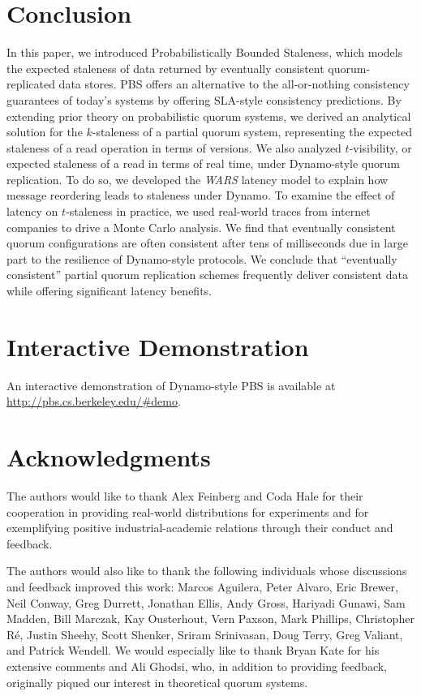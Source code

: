 \documentclass{vldb}
\newcommand{\sectionskip}{-0em}
\begin{document}
\vspace{\sectionskip}\section{Conclusion}
\label{sec:conclusion}

In this paper, we introduced Probabilistically Bounded Staleness,
which models the expected staleness of data returned by eventually
consistent quorum-replicated data stores.  PBS offers an alternative
to the all-or-nothing consistency guarantees of today's systems by
offering SLA-style consistency predictions. By extending prior theory
on probabilistic quorum systems, we derived an analytical solution for
the $k$-staleness of a partial quorum system, representing the
expected staleness of a read operation in terms of versions.  We also
analyzed $t$-visibility, or expected staleness of a read in terms of
real time, under Dynamo-style quorum replication.  To do so, we
developed the \textit{WARS} latency model to explain how message
reordering leads to staleness under Dynamo.  To examine the effect of
latency on $t$-staleness in practice, we used real-world traces from
internet companies to drive a Monte Carlo analysis.  We find that
eventually consistent quorum configurations are often consistent after
tens of milliseconds due in large part to the resilience of
Dynamo-style protocols.  We conclude that ``eventually consistent''
partial quorum replication schemes frequently deliver consistent data
while offering significant latency benefits.

\vspace{\sectionskip}\section*{Interactive Demonstration} An
interactive demonstration of Dynamo-style PBS is available at
\url{http://pbs.cs.berkeley.edu/#demo}.

\section*{Acknowledgments}

The authors would like to thank Alex Feinberg and Coda Hale for their
cooperation in providing real-world distributions for experiments and
for exemplifying positive industrial-academic relations through their
conduct and feedback.

The authors would also like to thank the following individuals whose
discussions and feedback improved this work: Marcos Aguilera, Peter
Alvaro, Eric Brewer, Neil Conway, Greg Durrett, Jonathan Ellis, Andy
Gross, Hariyadi Gunawi, Sam Madden, Bill Marczak, Kay Ousterhout, Vern
Paxson, Mark Phillips, Christopher R\'e, Justin Sheehy, Scott Shenker,
Sriram Srinivasan, Doug Terry, Greg Valiant, and Patrick Wendell.  We
would especially like to thank Bryan Kate for his extensive comments
and Ali Ghodsi, who, in addition to providing feedback, originally
piqued our interest in theoretical quorum systems.
\end{document}
